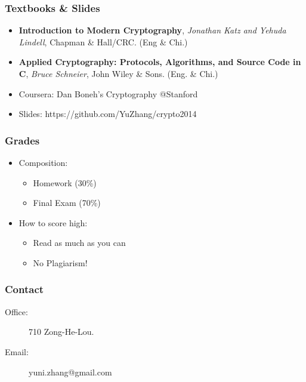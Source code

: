 \begin{frame}\frametitle{Textbooks \& Slides}
\begin{itemize}
\item \textbf{Introduction to Modern Cryptography}, \emph{Jonathan Katz and Yehuda Lindell}, Chapman \& Hall/CRC. (Eng \& Chi.)
\item \textbf{Applied Cryptography: Protocols, Algorithms, and Source Code in C}, \emph{Bruce Schneier}, John Wiley \& Sons. (Eng. \& Chi.)
\item Coursera: Dan Boneh's Cryptography @Stanford
\item Slides: https://github.com/YuZhang/crypto2014
\end{itemize}
\end{frame}
\begin{frame}\frametitle{Grades}
\begin{itemize}
\item Composition:
\begin{itemize}
\item Homework (30\%)
\item Final Exam (70\%)
\end{itemize}
\item How to score high:
\begin{itemize}
\item Read as much as you can
\item \alert{No Plagiarism!}
\end{itemize}
\end{itemize}
\end{frame}
\begin{frame}\frametitle{Contact}
\begin{description} 
\item[Office:] 710 Zong-He-Lou.
\item[Email:] yuni.zhang@gmail.com 
\end{description}
\end{frame}

